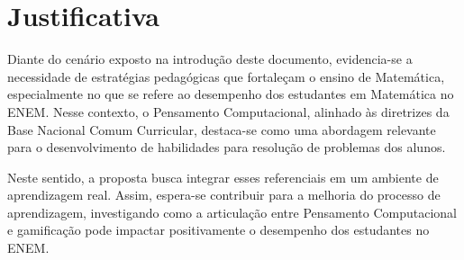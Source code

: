 
\chapter{Justificativa}
\label{ch:justificativa}

Diante do cenário exposto na introdução deste documento, evidencia-se a
necessidade de estratégias pedagógicas que fortaleçam o ensino de Matemática,
especialmente no que se refere ao desempenho dos estudantes em Matemática no
ENEM. Nesse contexto, o Pensamento Computacional, alinhado às diretrizes da
Base Nacional Comum Curricular, destaca-se como uma abordagem relevante
para o desenvolvimento de habilidades para resolução de problemas dos alunos.

Neste sentido, a proposta busca integrar esses referenciais em um ambiente de
aprendizagem real. Assim, espera-se contribuir para a melhoria do processo de
aprendizagem, investigando como a articulação entre Pensamento Computacional e gamificação pode
impactar positivamente o desempenho dos estudantes no ENEM.
